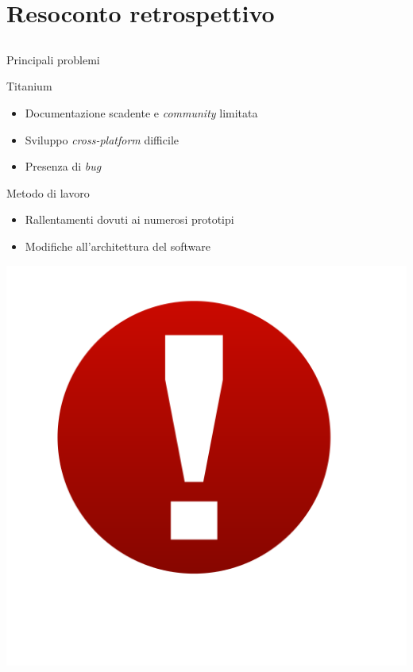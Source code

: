 \section{Resoconto retrospettivo}
	\subsection{}
		\begin{frame}{Principali problemi}
			\begin{block}{Titanium}
				\begin{itemize}
					\item Documentazione scadente e \emph{community} limitata
					\item Sviluppo \emph{cross-platform} difficile
					\item Presenza di \emph{bug}
				\end{itemize}
			\end{block}
			\begin{minipage}{0.75\textwidth}
				\begin{block}{Metodo di lavoro}
					\begin{itemize}
						\item Rallentamenti dovuti ai numerosi prototipi
						\item Modifiche all'architettura del software
					\end{itemize}
				\end{block}
			\end{minipage}
			\begin{minipage}{0.21\textwidth}
				\includegraphics[width=\textwidth]{capitolo_4/immagini/problema.png}
			\end{minipage}
		\end{frame}
